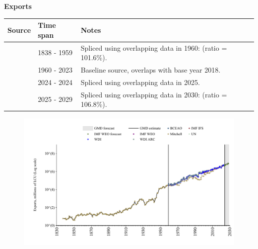 \documentclass[12pt,a4paper,landscape]{article}
\begin{document}
\begin{adjustbox}{max totalsize={\paperwidth}{\paperheight},center}
\begin{minipage}[t][\textheight][t]{\textwidth}
\vspace*{0.5cm}
{}
\begin{center}
{\Large\bfseries Exports}
\end{center}
\vspace{0.5cm}
\begin{table}[H]
\centering
\small
\begin{tabular}{|l|l|l|}
\hline
\textbf{Source} & \textbf{Time span} & \textbf{Notes} \\
\hline
\rowcolor{white}\cite{Mitchell}& 1838 - 1959 &Spliced using overlapping data in 1960: (ratio = 101.6\%). \\
\rowcolor{lightgray}\cite{WDI}& 1960 - 2023 &Baseline source, overlaps with base year 2018. \\
\rowcolor{white}\cite{BCEAO}& 2024 - 2024 &Spliced using overlapping data in 2025. \\
\rowcolor{lightgray}\cite{IMF_WEO_forecast}& 2025 - 2029 &Spliced using overlapping data in 2030: (ratio = 106.8\%). \\
\hline
\end{tabular}
\end{table}
\begin{figure}[H]
\centering
\includegraphics[width=\textwidth,height=0.6\textheight,keepaspectratio]{graphs/SEN_exports.pdf}
\end{figure}
\end{minipage}
\end{adjustbox}
\end{document}
